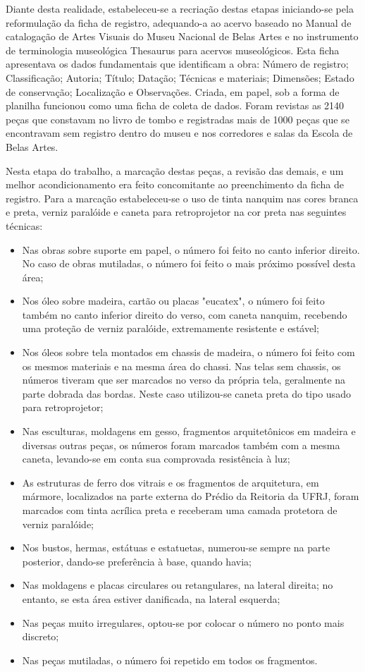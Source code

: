 Diante desta realidade, estabeleceu-se a recriação destas etapas iniciando-se pela reformulação da ficha de registro, adequando-a ao acervo baseado no Manual de catalogação de Artes Visuais do Museu Nacional de Belas Artes e no instrumento de terminologia museológica Thesaurus para acervos museológicos. Esta ficha apresentava os dados fundamentais que identificam a obra: Número de registro; Classificação; Autoria; Título; Datação; Técnicas e materiais; Dimensões; Estado de conservação; Localização e Observações. Criada, em papel, sob a forma de planilha funcionou como uma ficha de coleta de dados. Foram revistas as 2140 peças que constavam no livro de tombo e registradas mais de 1000 peças que se encontravam sem registro dentro do museu e nos corredores e salas da Escola de Belas Artes.

Nesta etapa do trabalho, a marcação destas peças, a revisão das demais, e um melhor acondicionamento era feito concomitante ao preenchimento da ficha de registro. Para a marcação estabeleceu-se o uso de tinta nanquim nas cores branca e preta, verniz paralóide e caneta para retroprojetor na cor preta nas seguintes técnicas:

\begin{itemize}
\item Nas obras sobre suporte em papel, o número foi feito no canto inferior direito. No caso de obras mutiladas, o número foi feito o mais próximo possível desta área;
\item Nos óleo sobre madeira, cartão ou placas "eucatex", o número foi feito também no canto inferior direito do verso, com caneta nanquim, recebendo uma proteção de verniz paralóide, extremamente resistente e estável;
\item Nos óleos sobre tela montados em chassis de madeira, o número foi feito com os mesmos materiais e na mesma área do chassi. Nas telas sem chassis, os números tiveram que ser marcados no verso da própria tela, geralmente na parte dobrada das bordas. Neste caso utilizou-se caneta preta do tipo usado para retroprojetor;
\item Nas esculturas, moldagens em gesso, fragmentos arquitetônicos em madeira e diversas outras peças, os números foram marcados também com a mesma caneta, levando-se em conta sua comprovada resistência à luz;
\item As estruturas de ferro dos vitrais e os fragmentos de arquitetura, em mármore, localizados na parte externa do Prédio da Reitoria da UFRJ, foram marcados com tinta acrílica preta e receberam uma camada protetora de verniz paralóide;
\item Nos bustos, hermas, estátuas e estatuetas, numerou-se sempre na parte posterior, dando-se preferência à base, quando havia;
\item Nas moldagens e placas circulares ou retangulares, na lateral direita; no entanto, se esta área estiver danificada, na lateral esquerda;
\item Nas peças muito irregulares, optou-se por colocar o número no ponto mais discreto;
\item Nas peças mutiladas, o número foi repetido em todos os fragmentos.
\end{itemize}

